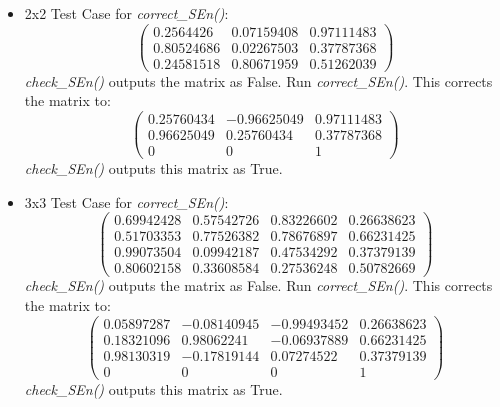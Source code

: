 \documentclass{article}
\begin{document}
\begin{itemize}
    \item 2x2 Test Case for \textit{correct\_SEn()}:
    \[
    \begin{pmatrix}
    0.2564426 & 0.07159408 & 0.97111483 \\
    0.80524686 & 0.02267503 & 0.37787368 \\
    0.24581518 & 0.80671959 & 0.51262039
    \end{pmatrix}
    \]
    \textit{check\_SEn()} outputs the matrix as False.
    Run \textit{correct\_SEn()}. This corrects the matrix to:
    \[
    \begin{pmatrix}
    0.25760434 & -0.96625049 & 0.97111483 \\
    0.96625049 & 0.25760434 & 0.37787368 \\
    0 & 0 & 1
    \end{pmatrix}
    \]
    \textit{check\_SEn()} outputs this matrix as True.

    \item 3x3 Test Case for \textit{correct\_SEn()}:
    \[
    \begin{pmatrix}
    0.69942428 & 0.57542726 & 0.83226602 & 0.26638623 \\
    0.51703353 & 0.77526382 & 0.78676897 & 0.66231425 \\
    0.99073504 & 0.09942187 & 0.47534292 & 0.37379139 \\
    0.80602158 & 0.33608584 & 0.27536248 & 0.50782669
    \end{pmatrix}
    \]
    \textit{check\_SEn()} outputs the matrix as False.
    Run \textit{correct\_SEn()}. This corrects the matrix to:
    \[
    \begin{pmatrix}
    0.05897287 & -0.08140945 & -0.99493452 & 0.26638623 \\
    0.18321096 & 0.98062241 & -0.06937889 & 0.66231425 \\
    0.98130319 & -0.17819144 & 0.07274522 & 0.37379139 \\
    0 & 0 & 0 & 1
    \end{pmatrix}
    \]
    \textit{check\_SEn()} outputs this matrix as True.
    
\end{itemize}
\end{document}
